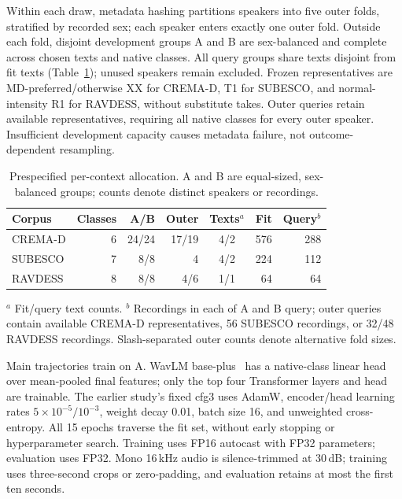 \documentclass[letterpaper]{article}
\begin{document}
Within each draw, metadata hashing partitions speakers into five outer
folds, stratified by recorded sex; each speaker enters exactly one outer
fold. Outside each fold, disjoint development
groups A and B are sex-balanced and complete across chosen texts and
native classes. All query groups share texts disjoint from fit texts
(Table~\ref{tab:final-program-panels}); unused speakers remain excluded.
Frozen representatives are MD-preferred/otherwise XX for CREMA-D, T1 for
SUBESCO, and normal-intensity R1 for RAVDESS, without substitute takes.
Outer queries retain available representatives, requiring all native
classes for every outer speaker. Insufficient development capacity causes
metadata failure, not outcome-dependent resampling.

\begin{table}[t]
\centering
\caption{Prespecified per-context allocation. A and B are equal-sized,
sex-balanced groups; counts denote distinct speakers or recordings.}
\label{tab:final-program-panels}
\small
\setlength{\tabcolsep}{3pt}
\begin{tabular}{lrrrcrr}
\hline
Corpus & Classes & A/B & Outer & Texts$^a$ & Fit & Query$^b$\\
\hline
CREMA-D & 6 & 24/24 & 17/19 & 4/2 & 576 & 288\\
SUBESCO & 7 & 8/8 & 4 & 4/2 & 224 & 112\\
RAVDESS & 8 & 8/8 & 4/6 & 1/1 & 64 & 64\\
\hline
\end{tabular}
\par\raggedright\small
$^a$ Fit/query text counts. $^b$ Recordings in each of A and B query;
outer queries contain available CREMA-D representatives, 56 SUBESCO
recordings, or 32/48 RAVDESS recordings. Slash-separated outer counts
denote alternative fold sizes.
\end{table}

Main trajectories train on A. WavLM base-plus~\cite{wavlm} has a
native-class linear head over mean-pooled final features; only the top
four Transformer layers and head are trainable. The earlier study's fixed
cfg3 uses AdamW,
encoder/head learning rates $5\times10^{-5}/10^{-3}$, weight decay 0.01,
batch size 16, and unweighted cross-entropy. All 15 epochs traverse the
fit set, without early stopping or hyperparameter search. Training uses
FP16 autocast with FP32 parameters; evaluation uses FP32.
Mono 16\,kHz audio is silence-trimmed at 30\,dB; training uses three-second crops
or zero-padding, and evaluation retains at most the first ten seconds.
\end{document}
